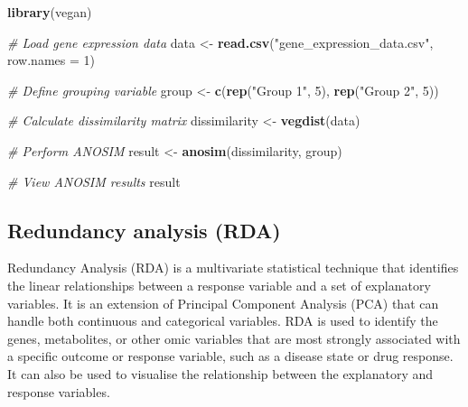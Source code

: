 \documentclass[
]{book}
\newenvironment{Shaded}{\begin{snugshade}}{\end{snugshade}}
\newcommand{\AttributeTok}[1]{\textcolor[rgb]{0.13,0.29,0.53}{#1}}
\newcommand{\CommentTok}[1]{\textcolor[rgb]{0.56,0.35,0.01}{\textit{#1}}}
\newcommand{\DecValTok}[1]{\textcolor[rgb]{0.00,0.00,0.81}{#1}}
\newcommand{\FunctionTok}[1]{\textcolor[rgb]{0.13,0.29,0.53}{\textbf{#1}}}
\newcommand{\NormalTok}[1]{#1}
\newcommand{\OtherTok}[1]{\textcolor[rgb]{0.56,0.35,0.01}{#1}}
\newcommand{\StringTok}[1]{\textcolor[rgb]{0.31,0.60,0.02}{#1}}
\begin{document}
\begin{Shaded}
\begin{Highlighting}[]
\FunctionTok{library}\NormalTok{(vegan)}

\CommentTok{\# Load gene expression data}
\NormalTok{data }\OtherTok{\textless{}{-}} \FunctionTok{read.csv}\NormalTok{(}\StringTok{"gene\_expression\_data.csv"}\NormalTok{, }\AttributeTok{row.names =} \DecValTok{1}\NormalTok{)}

\CommentTok{\# Define grouping variable}
\NormalTok{group }\OtherTok{\textless{}{-}} \FunctionTok{c}\NormalTok{(}\FunctionTok{rep}\NormalTok{(}\StringTok{"Group 1"}\NormalTok{, }\DecValTok{5}\NormalTok{), }\FunctionTok{rep}\NormalTok{(}\StringTok{"Group 2"}\NormalTok{, }\DecValTok{5}\NormalTok{))}

\CommentTok{\# Calculate dissimilarity matrix}
\NormalTok{dissimilarity }\OtherTok{\textless{}{-}} \FunctionTok{vegdist}\NormalTok{(data)}

\CommentTok{\# Perform ANOSIM}
\NormalTok{result }\OtherTok{\textless{}{-}} \FunctionTok{anosim}\NormalTok{(dissimilarity, group)}

\CommentTok{\# View ANOSIM results}
\NormalTok{result}
\end{Highlighting}
\end{Shaded}

\normalsize

\hypertarget{redundancy-analysis}{%
\subsection{Redundancy analysis (RDA)}\label{redundancy-analysis}}

Redundancy Analysis (RDA) is a multivariate statistical technique that identifies the linear relationships between a response variable and a set of explanatory variables. It is an extension of Principal Component Analysis (PCA) that can handle both continuous and categorical variables. RDA is used to identify the genes, metabolites, or other omic variables that are most strongly associated with a specific outcome or response variable, such as a disease state or drug response. It can also be used to visualise the relationship between the explanatory and response variables.

\small
\end{document}
